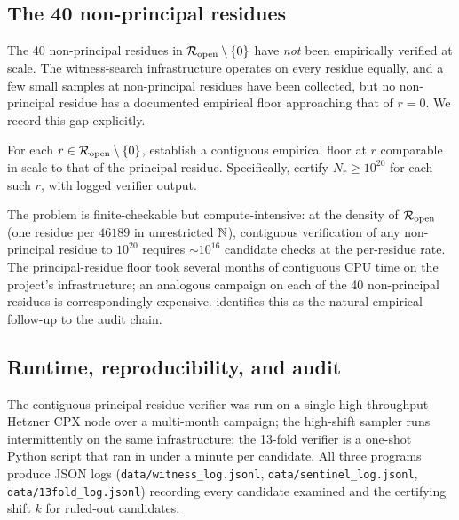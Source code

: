 \subsection{The 40 non-principal residues}
\label{sec:empirical-nonprincipal}

The 40 non-principal residues in $\mathcal{R}_{\mathrm{open}} \setminus \{0\}$ have
\emph{not} been empirically verified at scale. The witness-search
infrastructure operates on every residue equally, and a few small
samples at non-principal residues have been collected, but no
non-principal residue has a documented empirical floor approaching
that of $r = 0$. We record this gap explicitly.

\begin{problem}
\label{prob:non-principal-empirical}
For each $r \in \mathcal{R}_{\mathrm{open}} \setminus \{0\}$, establish a contiguous
empirical floor at $r$ comparable in scale to that of the principal
residue. Specifically, certify $N_r \ge 10^{20}$ for each such
$r$, with logged verifier output.
\end{problem}

The problem is finite-checkable but compute-intensive: at the
density of $\mathcal{R}_{\mathrm{open}}$ (one residue per $46189$ in unrestricted $\mathbb{N}$),
contiguous verification of any non-principal residue to $10^{20}$
requires $\sim 10^{16}$ candidate checks at the per-residue rate.
The principal-residue floor took several months of contiguous CPU
time on the project's infrastructure; an analogous campaign on each
of the 40 non-principal residues is correspondingly expensive.
 identifies this as the natural
empirical follow-up to the audit chain.

\subsection{Runtime, reproducibility, and audit}
\label{sec:empirical-runtime}

The contiguous principal-residue verifier was run on a single
high-throughput Hetzner CPX node over a multi-month campaign; the
high-shift sampler runs intermittently on the same infrastructure;
the 13-fold verifier is a one-shot Python script that ran in under
a minute per candidate. All three programs produce JSON logs
(\texttt{data/witness\_log.jsonl},
\texttt{data/sentinel\_log.jsonl},
\texttt{data/13fold\_log.jsonl}) recording every candidate examined
and the certifying shift $k$ for ruled-out candidates.

